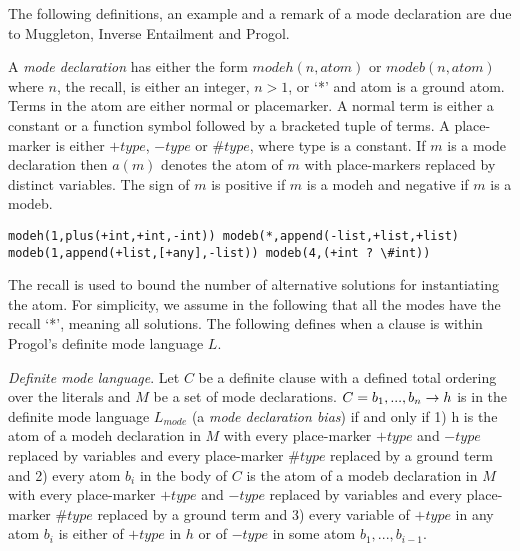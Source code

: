 The following definitions, an example and a remark of a mode declaration are due to Muggleton, Inverse Entailment and Progol\cite{muggleton1995}.
\begin{defn}\cite{muggleton1995}
A \emph{mode declaration} has either the form
$modeh(n,atom)$ or $modeb(n,atom)$ where $n$, the recall, is either an integer, $n > 1$,
or `*' and atom is a ground atom. Terms in the atom are either normal or placemarker. A normal term is either a constant or a function symbol followed by a
bracketed tuple of terms. A place-marker is either $+type$, $-type$ or $\#type$, where
type is a constant. If $m$ is a mode declaration then $a(m)$ denotes the atom of $m$
with place-markers replaced by distinct variables. The sign of $m$ is positive if $m$ is a modeh and negative if $m$ is a modeb.
\end{defn}

\begin{exmp}
\cite{muggleton1995}
\begin{lstlisting}
modeh(1,plus(+int,+int,-int)) modeb(*,append(-list,+list,+list)
modeb(1,append(+list,[+any],-list)) modeb(4,(+int ? \#int))
\end{lstlisting}
\end{exmp}

\begin{remark}
\cite{muggleton1995}
The recall is used to bound the number of alternative solutions for instantiating
the atom. For simplicity, we assume in the following that all the modes have the
recall `*', meaning all solutions. The following defines when a clause is within
Progol's definite mode language $L$.
\end{remark}

\begin{defn}
\cite{muggleton1995}
\emph{Definite mode language}. Let $C$ be a definite clause with a
defined total ordering over the literals and $M$ be a set of mode declarations. $C = b_1, ..., b_n \to h$ is in the definite mode language $L_{mode}$ (a \emph{mode declaration bias}) if and only if
1) h is the atom
of a modeh declaration in $M$ with every place-marker $+type$ and $-type$ replaced by
variables and every place-marker $\#type$ replaced by a ground term and 2) every
atom $b_i$ in the body of $C$ is the atom of a modeb declaration in $M$ with every
place-marker $+type$ and $-type$ replaced by variables and every place-marker $\#type$
replaced by a ground term and 3) every variable of $+type$ in any atom $b_i$ is either
of $+type$ in $h$ or of $-type$ in some atom $b_1, ..., b_{i-1}$.
\end{defn}

